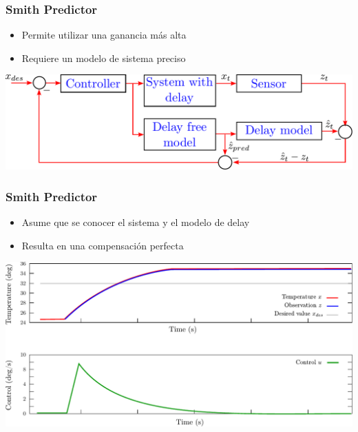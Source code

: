 \begin{frame}
    \frametitle{Smith Predictor}
    
    \begin{itemize}
        \item Permite utilizar una ganancia más alta
        \item Requiere un modelo de sistema preciso
    \end{itemize}
    
    \begin{center}
        \includegraphics[width=0.8\columnwidth]{images/smith_predictor.pdf}
    \end{center}
    
\end{frame}

\begin{frame}
    \frametitle{Smith Predictor}
    
    \begin{itemize}
        \item Asume que se conocer el sistema y el modelo de delay
        \item Resulta en una compensación perfecta
    \end{itemize}
    
    \begin{center}
        \includegraphics[width=0.8\columnwidth]{images/pid_control_proportional_smith_predictor.pdf}
    \end{center}
    
\end{frame}


